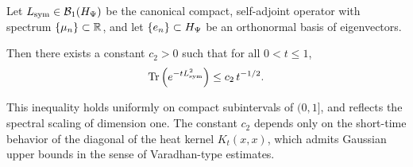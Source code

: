 \begin{lemma}
\label{lem:hk_upper_bound}
Let \( L_{\mathrm{sym}} \in \mathcal{B}_1(H_{\Psi}) \) be the canonical compact, self-adjoint operator with spectrum \( \{ \mu_n \} \subset \mathbb{R} \), and let \( \{ e_n \} \subset H_{\Psi} \) be an orthonormal basis of eigenvectors.

Then there exists a constant \( c_2 > 0 \) such that for all \( 0 < t \le 1 \),
\[
\operatorname{Tr}\left( e^{-t L_{\mathrm{sym}}^2} \right) \le c_2\, t^{-1/2}.
\]

\noindent
This inequality holds uniformly on compact subintervals of \( (0,1] \), and reflects the spectral scaling of dimension one. The constant \( c_2 \) depends only on the short-time behavior of the diagonal of the heat kernel \( K_t(x,x) \), which admits Gaussian upper bounds in the sense of Varadhan-type estimates.
\end{lemma}
